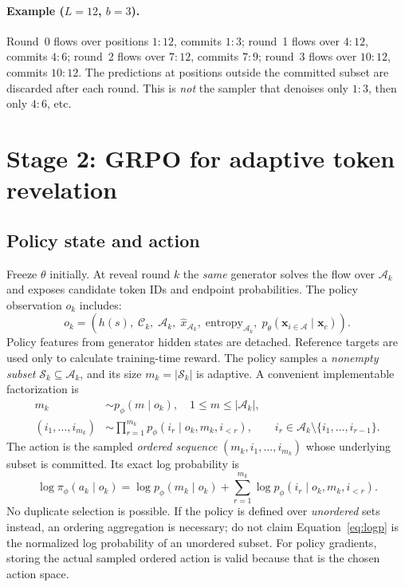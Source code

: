 \documentclass[11pt,a4paper]{article}
\newcommand{\C}{\mathcal C}
\newcommand{\A}{\mathcal A}
\newcommand{\Sset}{\mathcal S}
\begin{document}
\paragraph{Example ($L=12$, $b=3$).}
Round~0 flows over positions $1{:}12$, commits $1{:}3$; round~1 flows over $4{:}12$, commits $4{:}6$; round~2 flows over $7{:}12$, commits $7{:}9$; round~3 flows over $10{:}12$, commits $10{:}12$. The predictions at positions outside the committed subset are discarded after each round. This is \emph{not} the sampler that denoises only $1{:}3$, then only $4{:}6$, etc.

\section{Stage 2: GRPO for adaptive token revelation}
\subsection{Policy state and action}
Freeze $\theta$ initially. At reveal round $k$ the \emph{same} generator solves the flow over $\A_k$ and exposes candidate token IDs and endpoint probabilities. The policy observation $o_k$ includes:
\begin{equation}
o_k=(h(s),\;\C_k,\;\A_k,\;\widehat x_{\A_k},\;\text{entropy}_{\A_k},\;
p_{\theta}(\bm{x}_{i \in \A} \mid \bm{x}_{c})).
\end{equation}
Policy features from generator hidden states are detached. Reference targets are used only to calculate training-time reward. The policy samples a \emph{nonempty subset} $\Sset_k\subseteq\A_k$, and its size $m_k=|\Sset_k|$ is adaptive. A convenient implementable factorization is
\begin{align}
 m_k&\sim p_\phi(m\mid o_k),\quad 1\le m\le |\A_{k}|,\\
 (i_1,\ldots,i_{m_k})&\sim \prod_{r=1}^{m_k}p_\phi(i_r\mid o_k,m_k,i_{<r}),
\qquad i_r\in\A_k\setminus\{i_1,\ldots,i_{r-1}\}.\label{eq:act}
\end{align}
The action is the sampled \emph{ordered sequence} $(m_k,i_1,\ldots,i_{m_k})$ whose underlying subset is committed. Its exact log probability is
\begin{equation}
\boxed{\log\pi_\phi(a_k\mid o_k)=\log p_\phi(m_k\mid o_k)
+\sum_{r=1}^{m_k}\log p_\phi(i_r\mid o_k,m_k,i_{<r}).}\label{eq:logp}
\end{equation}
No duplicate selection is possible. If the policy is defined over \emph{unordered} sets instead, an ordering aggregation is necessary; do not claim Equation~\eqref{eq:logp} is the normalized log probability of an unordered subset. For policy gradients, storing the actual sampled ordered action is valid because that is the chosen action space.
\end{document}
